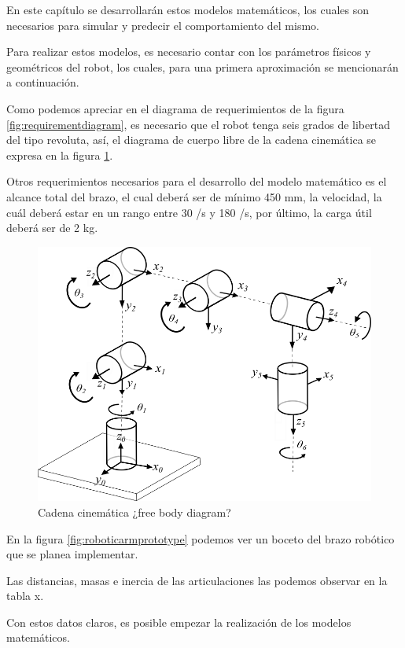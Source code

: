 En este capítulo se desarrollarán estos modelos matemáticos, los cuales son necesarios para simular y predecir el comportamiento del mismo. 

Para realizar estos modelos, es necesario contar con los parámetros físicos y geométricos del robot, los cuales, para una primera aproximación se mencionarán a continuación.

Como podemos apreciar en el diagrama de requerimientos de la figura \ref{fig:requirementdiagram}, es necesario que el robot tenga seis grados de libertad del tipo revoluta, así, el diagrama de cuerpo libre de la cadena cinemática se expresa en la figura \ref{fig:kinematicchain}.

Otros requerimientos necesarios para el desarrollo del modelo matemático es el alcance total del brazo, el cual deberá ser de mínimo 450 mm, la velocidad, la cuál deberá estar en un rango entre 30 \degree/s y 180 \degree/s, por último, la carga útil deberá ser de 2 kg.

\begin{figure}
    \centering
    \includegraphics[scale=0.45]{./img/chapter4/kinematicchainv5.png}
    \caption{Cadena cinemática ¿free body diagram?}
    \label{fig:kinematicchain}
\end{figure}

En la figura \ref{fig:roboticarmprototype} podemos ver un boceto del brazo robótico que se planea implementar.

Las distancias, masas e inercia de las articulaciones las podemos observar en la tabla x.

Con estos datos claros, es posible empezar la realización de los modelos matemáticos.

